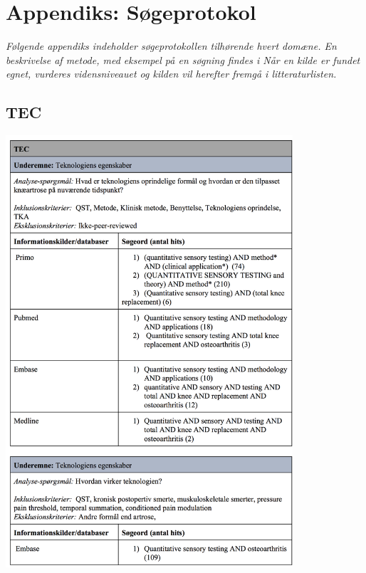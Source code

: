 \chapter{Appendiks: Søgeprotokol} \vspace{-.75cm}
\textit{Følgende appendiks indeholder søgeprotokollen tilhørende hvert domæne. En beskrivelse af metode, med eksempel på en søgning findes i  Når en kilde er fundet egnet, vurderes vidensniveauet og kilden vil herefter fremgå i litteraturlisten.}
\section{TEC}\label{TEC_sog}
\begin{center}
\includegraphics[width=0.8\textwidth]{rapportAfsnit/qBilag/sogninger/TEC1}


\end{center}
